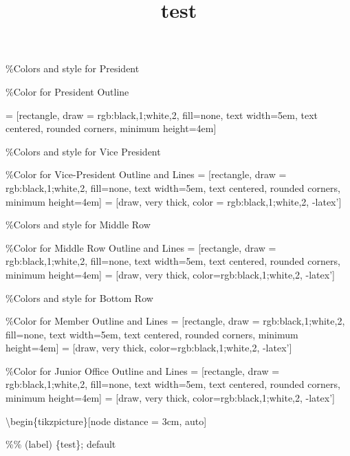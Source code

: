 \documentclass[
]{article}
\title{test}
\author{}
\date{\vspace{-2.5em}}
\begin{document}
\maketitle

\%Colors and style for President

\newcommand\Pcolor{rgb:black,1;white,2}

\%Color for President Outline

 = {[}rectangle, draw = rgb:black,1;white,2,
fill=none, text width=5em, text centered, rounded corners, minimum
height=4em{]}

\%Colors and style for Vice President

\newcommand\VPcolor{rgb:black,1;white,2}

\%Color for Vice-President Outline and Lines  =
{[}rectangle, draw = rgb:black,1;white,2, fill=none, text width=5em,
text centered, rounded corners, minimum height=4em{]} 
= {[}draw, very thick, color = rgb:black,1;white,2, -latex'{]}

\%Colors and style for Middle Row

\newcommand\RowOneColor{rgb:black,1;white,2}

\%Color for Middle Row Outline and Lines  =
{[}rectangle, draw = rgb:black,1;white,2, fill=none, text width=5em,
text centered, rounded corners, minimum height=4em{]} 
= {[}draw, very thick, color=rgb:black,1;white,2, -latex'{]}

\%Colors and style for Bottom Row

\newcommand\Mcolor{rgb:black,1;white,2}

\%Color for Member Outline and Lines  = {[}rectangle,
draw = rgb:black,1;white,2, fill=none, text width=5em, text centered,
rounded corners, minimum height=4em{]}  = {[}draw, very
thick, color=rgb:black,1;white,2, -latex'{]}

\newcommand\JOcolor{rgb:black,1;white,2}

\%Color for Junior Office Outline and Lines  =
{[}rectangle, draw = rgb:black,1;white,2, fill=none, text width=5em,
text centered, rounded corners, minimum height=4em{]} 
= {[}draw, very thick, color=rgb:black,1;white,2, -latex'{]}

\textbackslash begin\{tikzpicture\}{[}node distance = 3cm, auto{]}

\%\% \type [options] (label) \{test\}; default
\end{document}
